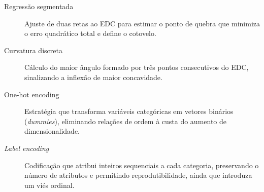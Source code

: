 \documentclass[12pt]{article} %
\begin{document}
\begin{description}
        \item[Regressão segmentada] Ajuste de duas retas ao EDC para estimar o ponto de quebra que minimiza o erro quadrático total e define o cotovelo.
        
        \item[Curvatura discreta] Cálculo do maior ângulo formado por três pontos consecutivos do EDC, sinalizando a inflexão de maior concavidade.
        
        \item[One-hot encoding] Estratégia que transforma variáveis categóricas em vetores binários (\textit{dummies}), eliminando relações de ordem à custa do aumento de dimensionalidade.
        
        \item[\textit{Label encoding}] Codificação que atribui inteiros sequenciais a cada categoria, preservando o número de atributos e permitindo reprodutibilidade, ainda que introduza um viés ordinal.
    \end{description}
	
\end{document}
